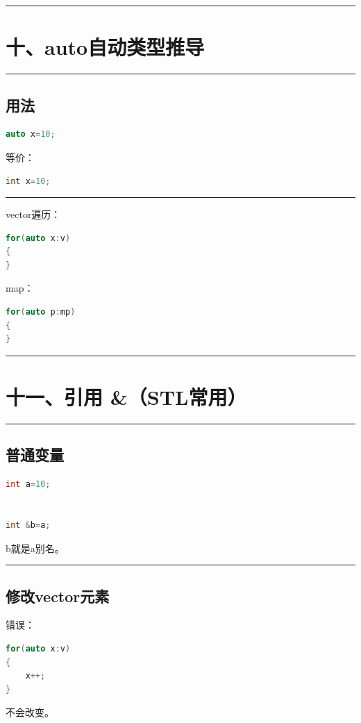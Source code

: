 \documentclass[9pt,twocolumn]{extarticle}
\begin{document}
\noindent\rule{\linewidth}{0.4pt}

\section{十、auto自动类型推导}

\noindent\rule{\linewidth}{0.4pt}

\subsection{用法}
\begin{lstlisting}[language=C++]
auto x=10;
\end{lstlisting}
等价：
\begin{lstlisting}[language=C++]
int x=10;
\end{lstlisting}

\noindent\rule{\linewidth}{0.4pt}

vector遍历：
\begin{lstlisting}[language=C++]
for(auto x:v)
{
}
\end{lstlisting}
map：
\begin{lstlisting}[language=C++]
for(auto p:mp)
{
}
\end{lstlisting}

\noindent\rule{\linewidth}{0.4pt}

\section{十一、引用 \&（STL常用）}

\noindent\rule{\linewidth}{0.4pt}

\subsection{普通变量}
\begin{lstlisting}[language=C++]
int a=10;


int &b=a;
\end{lstlisting}
b就是a别名。

\noindent\rule{\linewidth}{0.4pt}

\subsection{修改vector元素}
错误：
\begin{lstlisting}[language=C++]
for(auto x:v)
{
    x++;
}
\end{lstlisting}
不会改变。
\end{document}
